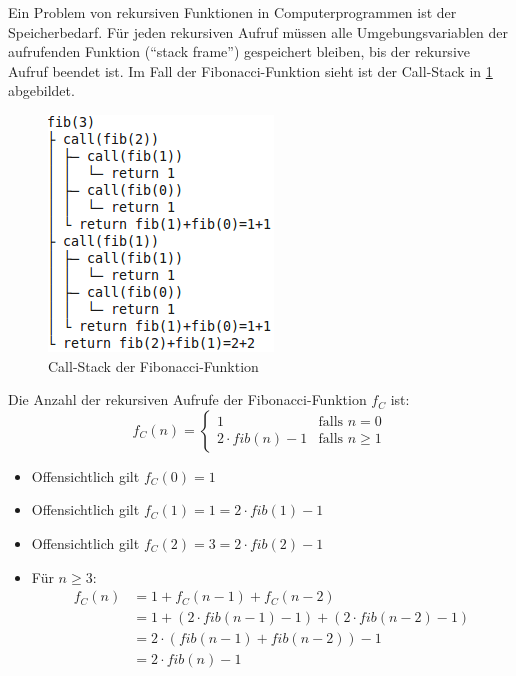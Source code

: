 Ein Problem von rekursiven Funktionen in Computerprogrammen ist der 
Speicherbedarf. Für jeden rekursiven Aufruf müssen alle Umgebungsvariablen
der aufrufenden Funktion (\enquote{stack frame}) gespeichert bleiben,
bis der rekursive Aufruf beendet ist. Im Fall der Fibonacci-Funktion
sieht ist der Call-Stack in \cref{fig:fib-callstack} abgebildet.

\begin{figure}[htp]
    \centering
    \includegraphics*[width=0.5\linewidth, keepaspectratio]{figures/fib-callstack.png} 
    \caption{Call-Stack der Fibonacci-Funktion}
    \label{fig:fib-callstack}
\end{figure}

\begin{bemerkung}
    Die Anzahl der rekursiven Aufrufe der Fibonacci-Funktion $f_C$ ist:
        \[f_C(n) = \begin{cases}
                        1 &\text{falls } n=0\\
                    2 \cdot fib(n) - 1 &\text{falls } n \geq 1
                    \end{cases}\]
\end{bemerkung}
\begin{beweis}\leavevmode
    \begin{itemize}
        \item Offensichtlich gilt $f_C(0) = 1$
        \item Offensichtlich gilt $f_C(1) = 1 = 2 \cdot fib(1) - 1$
        \item Offensichtlich gilt $f_C(2) = 3 = 2 \cdot fib(2) - 1$
        \item Für $n \geq 3$:
           \begin{align*}
                f_C(n) &= 1 + f_C(n-1) + f_C(n-2)\\
                       &= 1 + (2\cdot fib(n-1)-1) + (2 \cdot fib(n-2)-1)\\
                       &=2\cdot (fib(n-1) + fib(n-2)) - 1\\
                       &=2 \cdot fib(n) - 1
            \end{align*}
    \end{itemize}
\end{beweis}

